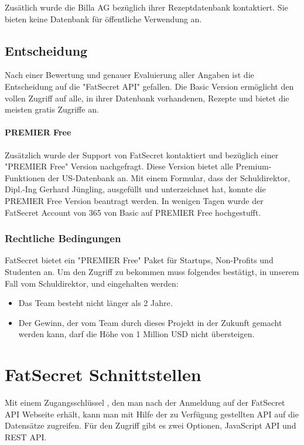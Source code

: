 Zusätlich wurde die Billa AG bezüglich ihrer Rezeptdatenbank kontaktiert. Sie bieten keine Datenbank für öffentliche Verwendung an. 

\subsection{Entscheidung}

Nach einer Bewertung und genauer Evaluierung aller Angaben ist die Entscheidung auf die "FatSecret API" gefallen. Die Basic Version ermöglicht den vollen Zugriff auf alle, in ihrer Datenbank vorhandenen, Rezepte und bietet die meisten gratis Zugriffe an. 
\paragraph{PREMIER Free}
Zusätzlich wurde der Support von FatSecret kontaktiert und bezüglich einer "PREMIER Free" Version nachgefragt. Diese Version bietet alle Premium-Funktionen der US-Datenbank an.
Mit einem Formular, dass der Schuldirektor, Dipl.-Ing Gerhard Jüngling, ausgefüllt und unterzeichnet hat, konnte die PREMIER Free Version beantragt werden. In wenigen Tagen wurde der FatSecret Account von 365 von Basic auf PREMIER Free hochgestufft.

\subsubsection{Rechtliche Bedingungen}

FatSecret bietet ein "PREMIER Free" Paket für Startups, Non-Profits und Studenten an. Um den Zugriff zu bekommen muss folgendes bestätigt, in unserem Fall vom Schuldirektor, und eingehalten werden:

\begin{itemize}
\item Das Team besteht nicht länger als 2 Jahre.
\item Der Gewinn, der vom Team durch dieses Projekt in der Zukunft gemacht werden kann, darf die Höhe von 1 Million USD nicht übersteigen.
\end{itemize}

\section{FatSecret Schnittstellen}

Mit einem Zugangsschlüssel \cite{fatsecretJS}, den man nach der Anmeldung auf der FatSecret API Webseite erhält, kann man mit Hilfe der zu Verfügung gestellten API auf die Datensätze zugreifen. Für den Zugriff gibt es zwei Optionen, JavaScript API und REST API.
